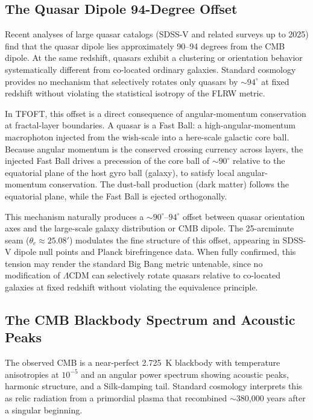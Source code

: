 \documentclass[11pt,a4paper]{article}
\begin{document}
\subsection{The Quasar Dipole 94-Degree Offset}

Recent analyses of large quasar catalogs (SDSS-V and related surveys up to 2025) find that the quasar dipole lies approximately 90--94 degrees from the CMB dipole. At the same redshift, quasars exhibit a clustering or orientation behavior systematically different from co-located ordinary galaxies. Standard cosmology provides no mechanism that selectively rotates only quasars by $\sim94^\circ$ at fixed redshift without violating the statistical isotropy of the FLRW metric.

In TFOFT, this offset is a direct consequence of angular-momentum conservation at fractal-layer boundaries. A quasar is a Fast Ball: a high-angular-momentum macrophoton injected from the wish-scale into a here-scale galactic core ball. Because angular momentum is the conserved crossing currency across layers, the injected Fast Ball drives a precession of the core ball of $\sim90^\circ$ relative to the equatorial plane of the host gyro ball (galaxy), to satisfy local angular-momentum conservation. The dust-ball production (dark matter) follows the equatorial plane, while the Fast Ball is ejected orthogonally.

This mechanism naturally produces a $\sim90^\circ$--$94^\circ$ offset between quasar orientation axes and the large-scale galaxy distribution or CMB dipole. The 25-arcminute seam ($\theta_c \approx 25.08'$) modulates the fine structure of this offset, appearing in SDSS-V dipole null points and Planck birefringence data. When fully confirmed, this tension may render the standard Big Bang metric untenable, since no modification of $\Lambda$CDM can selectively rotate quasars relative to co-located galaxies at fixed redshift without violating the equivalence principle.

\subsection{The CMB Blackbody Spectrum and Acoustic Peaks}

The observed CMB is a near-perfect 2.725~K blackbody with temperature anisotropies at $10^{-5}$ and an angular power spectrum showing acoustic peaks, harmonic structure, and a Silk-damping tail. Standard cosmology interprets this as relic radiation from a primordial plasma that recombined $\sim$380,000 years after a singular beginning.
\end{document}
